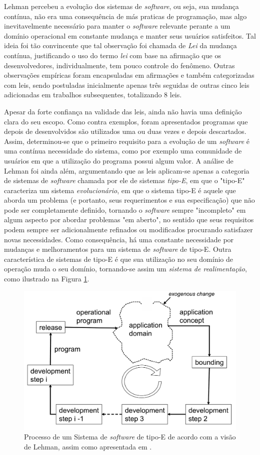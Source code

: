 Lehman percebeu a evolução dos sistemas de \textit{software}, ou seja, sua mudança contínua, não era uma consequência de más praticas de programação, mas algo inevitavelmente necessário para manter o \textit{software} relevante perante a um domínio operacional em constante mudança e manter seus usuários satisfeitos. Tal ideia foi tão convincente que tal observação foi chamada de \textit{Lei} da mudança contínua, justificando o uso do termo \textit{lei} com base na afirmação que os desenvolvedores, individualmente, tem pouco controle do fenômeno. Outras observações empíricas foram encapsuladas em afirmações e também categorizadas com leis, sendo postuladas inicialmente apenas três seguidas de outras cinco leis adicionadas em trabalhos subsequentes, totalizando 8 leis.

Apesar da forte confiança na validade das leis, ainda não havia uma definição clara do seu escopo. Como contra exemplos, foram apresentados programas que depois de desenvolvidos são utilizados uma ou duas vezes e depois descartados. Assim, determinou-se que o primeiro requisito para a evolução de um \textit{software} é uma contínua necessidade do sistema, como por exemplo uma comunidade de usuários em que a utilização do programa possui algum valor. A análise de Lehman foi ainda além, argumentando que as leis aplicam-se apenas a categoria de sistemas de \textit{software} chamada por ele de sistemas \textit{tipo-E}\cite{lehman1979understanding}, em que o "tipo-E" caracteriza um sistema \textit{evolucionário}, em que o sistema tipo-E é aquele que aborda um problema (e portanto, seus requerimentos e sua especificação) que não pode ser completamente definido, tornando o \textit{software} sempre "incompleto" em algum aspecto por abordar problemas "em aberto", no sentido que seus requisitos podem sempre ser adicionalmente refinados ou modificados procurando satisfazer novas necessidades. Como consequência, há uma constante necessidade por mudanças e melhoramentos para um sistema de \textit{software} de tipo-E. Outra característica de sistemas de tipo-E é que sua utilização no seu domínio de operação muda o seu domínio, tornando-se assim um \textit{sistema de realimentação}, como ilustrado na Figura \ref{fig:feedbacksystem}. %

\begin{figure}
	\centering
	\includegraphics[width=0.7\linewidth]{figure/feedback_system}
	\caption{Processo de um Sistema de \textit{software} de tipo-E de acordo com a visão de Lehman, assim como apresentada em \cite{softwareEvolution2008}.}
	\label{fig:feedbacksystem}
\end{figure}

